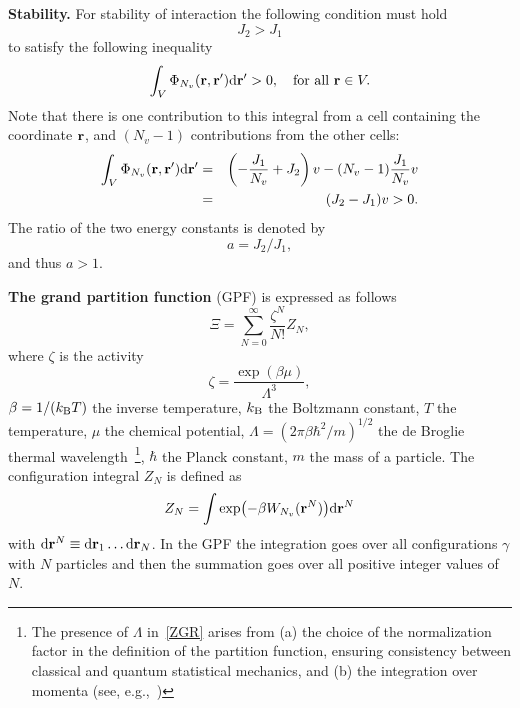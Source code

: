 \documentclass[12pt]{article}
\numberwithin{equation}{section}
\begin{document}
	\textbf{Stability.} For stability of interaction the following condition must hold
	\begin{equation*}
		J_2 > J_1
	\end{equation*}
	to satisfy the following inequality~\cite{KKD20,Ruelle70}
	\begin{equation}
		\int_{V} \Phi_{N_v}(\vb{r},\vb{r}') {\rm d} \vb{r}' > 0, \quad \text{for all } \vb{r} \in V.
	\end{equation}
	Note that there is one contribution to this integral from a cell containing the coordinate $\vb{r}$, and $(N_v - 1)$ contributions from the other cells:
	\begin{eqnarray*}
		\int_{V} \Phi_{N_v}(\vb{r},\vb{r}') {\rm d} \vb{r}' & = & \left(-\frac{J_1}{N_v} + J_2\right)v - (N_v - 1) \frac{J_1}{N_v}v
		\\
		& = & (J_2 - J_1)v > 0.
	\end{eqnarray*}
	The ratio of the two energy constants is denoted by
	$$a = J_2/J_1,$$
	and thus $a > 1.$
	
	\textbf{The grand partition function} (GPF) is expressed as follows~\cite[see eqs.~(2.4.6) and~(2.3.13)]{HansenMcDonald13}
	\begin{equation}\label{ZGR}
		\Xi=\sum_{N=0}^{\infty}\frac{\zeta^N}{N!}Z_N,
	\end{equation}
		where $\zeta$ is the activity
	\begin{equation*}
		\zeta = \frac{\exp(\beta \mu)}{\Lambda^3},
	\end{equation*}
	$\beta = 1/(k_{\rm B} T)$ the inverse temperature, $k_{\rm B}$ the Boltzmann constant, $T$ the temperature, $\mu$ the chemical potential, $\Lambda = (2\pi\beta\hbar^2/m)^{1/2}$ the de Broglie thermal wavelength~\footnote{The presence of $\Lambda$ in~\eqref{ZGR} arises from (a) the choice of the normalization factor in the definition of the partition function, ensuring consistency between classical and quantum statistical mechanics, and (b) the integration over momenta (see, e.g.,~\cite[Section~2.3]{HansenMcDonald13})}, $\hbar$ the Planck constant, $m$ the mass of a particle. The configuration integral $Z_N$ is defined as
	\begin{equation}
		Z_N = \int\exp(-\beta W_{N_v}(\vb{r}^N)){\rm d}\vb{r}^N
	\end{equation}
	with ${\rm d} \vb{r}^N \equiv {\rm d}{\vb r_1} \dotsc {\rm d}{\vb r_N}$.
	In the GPF the integration goes over all configurations $\gamma$ with $N$ particles and then the summation goes over all positive integer values of $N$.
	
\end{document}
